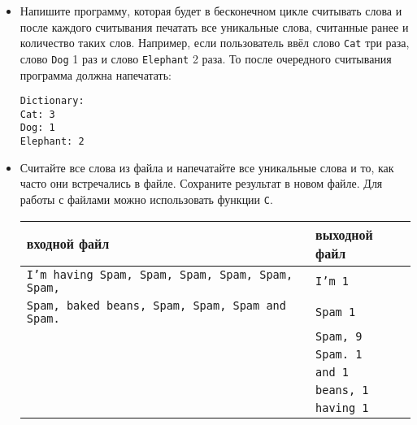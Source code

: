 \documentclass{article}
\begin{document}
\newpage
\begin{itemize}
\item Напишите программу, которая будет в бесконечном цикле считывать слова и после каждого считывания печатать все уникальные слова, считанные ранее и количество таких слов. Например, если пользователь ввёл слово \texttt{Cat} три раза, слово \texttt{Dog} 1 раз и слово \texttt{Elephant} 2 раза. То после очередного считывания программа должна напечатать:
\begin{verbatim}
Dictionary:
Cat: 3
Dog: 1
Elephant: 2
\end{verbatim}
\item Считайте все слова из файла и напечатайте все уникальные слова и то, как часто они встречались в файле. Сохраните результат в новом файле. Для работы с файлами можно использовать функции \texttt{C}.
\begin{center}
\begin{tabular}{ l | l }
 входной файл & выходной файл \\ \hline
 \texttt{I'm having Spam, Spam, Spam, Spam, Spam, Spam,} & \texttt{I'm 1}  \\
 \texttt{Spam, baked beans, Spam, Spam, Spam and Spam.}  &  \texttt{Spam 1}  \\
                                                         &  \texttt{Spam, 9}  \\ 
                                                         &  \texttt{Spam. 1}  \\ 
                                                         &  \texttt{and 1}  \\ 
                                                         &  \texttt{beans, 1}  \\ 
                                                         &  \texttt{having 1}  \\                                                      
\end{tabular}
\end{center}
\end{itemize}
\end{document}
